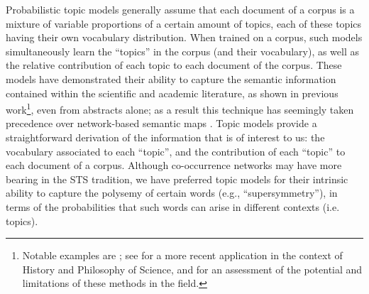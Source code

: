 \documentclass[smallextended]{svjour3}
\begin{document}
Probabilistic topic models generally assume that each document of a corpus is a mixture of variable proportions of a certain amount of topics, each of these topics having their own vocabulary distribution. When trained on a corpus, such models simultaneously learn the ``topics'' in the corpus (and their vocabulary), as well as the relative contribution of each topic to each document of the corpus. %
These models have demonstrated their ability to capture the semantic information contained within the scientific and academic literature, as shown in previous work\footnote{Notable examples are \citealt{Nichols2014,Hall2008,Griffiths2004}; see \citealt{Malaterre2022} for a more recent application in the context of History and Philosophy of Science, and \citealt{Allen2022} for an assessment of the potential and limitations of these methods in the field.}, even from abstracts alone\citep{Syed2017}; as a result this technique has seemingly taken precedence over network-based semantic maps \citep[Figure~1]{Leydesdorff2016}. Topic models provide a straightforward derivation of the information that is of interest to us: the vocabulary associated to each ``topic'', and the contribution of each ``topic'' to each document of a corpus. Although co-occurrence networks may have more bearing in the STS tradition, we have preferred topic models for their intrinsic ability to capture the polysemy of certain words (e.g., ``supersymmetry''), in terms of the probabilities that such words can arise in different contexts (i.e. topics).
\end{document}
